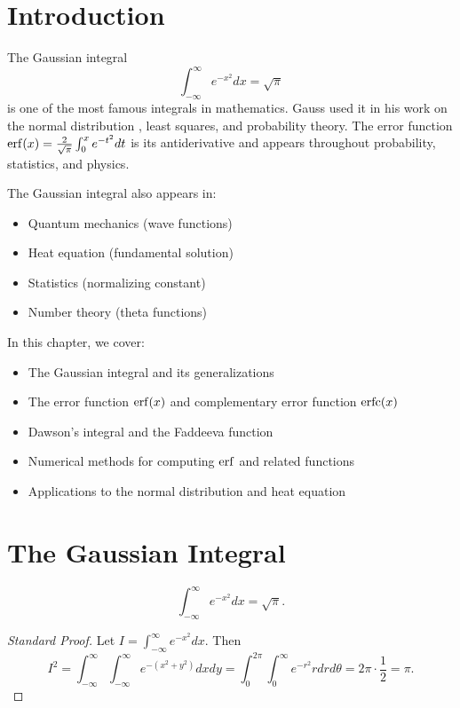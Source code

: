\section{Introduction}

The Gaussian integral 
\[
\int_{-\infty}^{\infty} e^{-x^2} dx = \sqrt{\pi}
\]
is one of the most famous integrals in mathematics. Gauss used it in his work on the normal distribution , least squares, and probability theory. The error function  $\operatorname{erf}(x) = \frac{2}{\sqrt{\pi}} \int_0^x e^{-t^2} dt$ is its antiderivative and appears throughout probability, statistics, and physics.

The Gaussian integral also appears in:
\begin{itemize}
    \item Quantum mechanics  (wave functions)
    \item Heat equation  (fundamental solution)
    \item Statistics (normalizing constant)
    \item Number theory (theta functions)
\end{itemize}

In this chapter, we cover:
\begin{itemize}
    \item The Gaussian integral and its generalizations
    \item The error function $\operatorname{erf}(x)$ and complementary error function  $\operatorname{erfc}(x)$
    \item Dawson's integral  and the Faddeeva function 
    \item Numerical methods for computing $\operatorname{erf}$ and related functions
    \item Applications to the normal distribution and heat equation 
\end{itemize}

\section{The Gaussian Integral}

\begin{theorem}
\[
\int_{-\infty}^{\infty} e^{-x^2} dx = \sqrt{\pi}.
\]
\end{theorem}

\begin{proof}[Standard Proof]
Let $I = \int_{-\infty}^{\infty} e^{-x^2} dx$. Then
\[
I^2 = \int_{-\infty}^{\infty} \int_{-\infty}^{\infty} e^{-(x^2+y^2)} dx dy = \int_0^{2\pi} \int_0^{\infty} e^{-r^2} r dr d\theta = 2\pi \cdot \frac{1}{2} = \pi.
\]
\end{proof}

